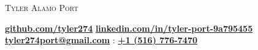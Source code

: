 \documentclass[9pt]{article}
\begin{document}
\begin{center}
	{\Large \scshape Tyler Alamo Port}
\end{center}
\vspace*{-2pt}
\hspace{7.25mm} \faGithub \hspace{0.25mm} \textbf{\href{https://github.com/tyler274}{github.com/tyler274}} \hspace{7.25mm} \faLinkedinSquare \hspace{0.25mm} \textbf{\href{https://linkedin.com/in/tyler-port-9a795455/}{linkedin.com/in/tyler-port-9a795455}} \\
\vspace*{3pt}  \hspace{12.25mm} \faEnvelope \hspace{0.1mm} \textbf{\href{mailto:tyler274port@gmail.com}{tyler274port@gmail.com}} \hspace{8.25mm} \faMobile : \textbf{\href{tel:15167767470}{+1 (516) 776-7470}}\\
\vspace{1pt}
\smallskip
\end{document}
